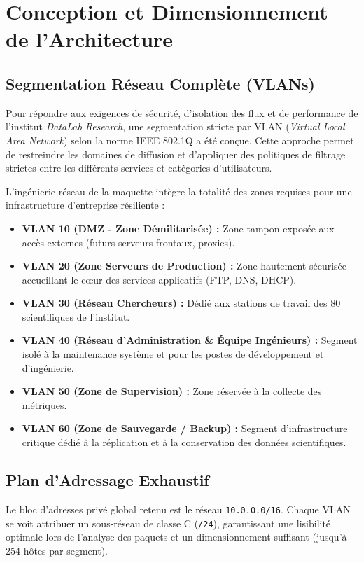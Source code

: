 \chapter{Conception et Dimensionnement de l'Architecture}
\label{chap:conception_dimensionnement}

\section{Segmentation Réseau Complète (VLANs)}
Pour répondre aux exigences de sécurité, d'isolation des flux et de performance de l'institut \textit{DataLab Research}, une segmentation stricte par VLAN (\textit{Virtual Local Area Network}) selon la norme IEEE 802.1Q a été conçue. Cette approche permet de restreindre les domaines de diffusion et d'appliquer des politiques de filtrage strictes entre les différents services et catégories d'utilisateurs.

L'ingénierie réseau de la maquette intègre la totalité des zones requises pour une infrastructure d'entreprise résiliente :
\begin{itemize}
    \item \textbf{VLAN 10 (DMZ - Zone Démilitarisée) :} Zone tampon exposée aux accès externes (futurs serveurs frontaux, proxies).
    \item \textbf{VLAN 20 (Zone Serveurs de Production) :} Zone hautement sécurisée accueillant le cœur des services applicatifs (FTP, DNS, DHCP).
    \item \textbf{VLAN 30 (Réseau Chercheurs) :} Dédié aux stations de travail des 80 scientifiques de l'institut.
    \item \textbf{VLAN 40 (Réseau d'Administration \& Équipe Ingénieurs) :}   Segment isolé  à la maintenance système et pour les postes de développement et d'ingénierie.
    \item \textbf{VLAN 50 (Zone de Supervision) :} Zone réservée à la collecte des métriques.
    \item \textbf{VLAN 60 (Zone de Sauvegarde / Backup) :} Segment d'infrastructure critique dédié à la réplication et à la conservation des données scientifiques.
\end{itemize}

\section{Plan d'Adressage Exhaustif}
Le bloc d'adresses privé global retenu est le réseau \texttt{10.0.0.0/16}. Chaque VLAN se voit attribuer un sous-réseau de classe C (\texttt{/24}), garantissant une lisibilité optimale lors de l'analyse des paquets et un dimensionnement suffisant (jusqu'à 254 hôtes par segment).

